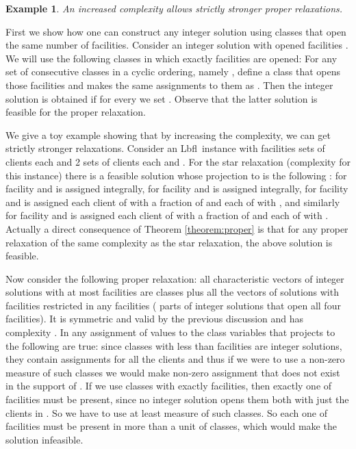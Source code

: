 \documentclass[11pt]{article}\usepackage{amsmath}
\newtheorem{example}{Example}[section]
\newcommand{\lbfl}{{\sc Lbfl}}
\begin{document}
\begin{example}\label{proper_str}
An increased complexity allows strictly stronger proper relaxations.
\end{example}

First we show how one can construct any integer solution using classes that open the
same number of facilities.
Consider an integer solution  with opened facilities . We will use the following classes 
in which exactly  facilities are opened:
For any set of   consecutive classes in a cyclic ordering, namely , define a class that opens those facilities and makes the same assignments to them 
as . Then the integer solution is obtained  if for every  we set .
Observe that the latter solution is feasible for the proper relaxation.

We give a toy example showing that by increasing the complexity, we can
get strictly stronger relaxations. Consider an \lbfl\ instance with  facilities  sets 
of  clients each and 2 sets  of  clients each and .  For the star relaxation
(complexity  for this instance)
there is a feasible solution  whose projection to 
 is the following : for facility   and is assigned  integrally, for facility   and is assigned  integrally, for facility   and is assigned each client of  with a fraction of  and each of  with , and similarly for facility   and is assigned
each client of  with a fraction of  and each of  with . Actually
a direct consequence of Theorem \ref{theorem:proper} is that for any proper relaxation of the same complexity as the star relaxation, the above solution is feasible.

Now consider the following proper relaxation: all characteristic vectors 
of integer solutions with at most
 facilities are classes plus all the 
vectors of solutions with  facilities restricted in any  facilities ( parts of integer solutions that open all four facilities).
It is symmetric and valid by the previous discussion and has complexity . 
In any assignment of values to the class variables  that projects to  the following are true:
since classes with less than  facilities are integer solutions, they contain
assignments for all the clients and thus if we were 
to use a non-zero measure of such classes we would make non-zero assignment 
that does not exist in the support of .
 If we use
classes with exactly  facilities, then exactly one of facilities  must be present, 
since no integer solution opens them both with just the clients in . 
So we have to use at least  measure of such classes. 
So each one of facilities 
must be present in more than a unit of classes, which would make the solution infeasible.
\end{document}
